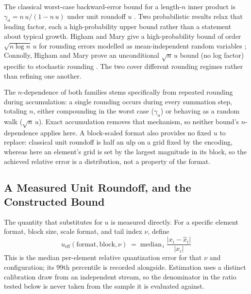 The classical worst-case backward-error bound for a length-$n$ inner product is
$\gamma_n = n\,u/(1-n\,u)$ under unit roundoff $u$ \citep{higham2002accuracy}.
Two probabilistic results relax that leading factor, each a high-probability
upper bound rather than a statement about typical growth. Higham and Mary give a
high-probability bound of order $\sqrt{n \log n}\,u$ for rounding errors modelled
as mean-independent random variables \citep{higham2019new}; Connolly, Higham and
Mary prove an unconditional $\sqrt{n}\,u$ bound (no log factor) specific to
stochastic rounding \citep{connolly2021stochastic}. The two cover different
rounding regimes rather than refining one another.

The $n$-dependence of both families stems specifically from repeated rounding
during accumulation: a single rounding occurs during every summation step,
totaling $n$, either compounding in the worst case ($\gamma_n$) or behaving as a
random walk ($\sqrt{n}\,u$). Exact accumulation removes that mechanism, so
neither bound's $n$-dependence applies here. A block-scaled format also provides
no fixed $u$ to replace: classical unit roundoff is half an ulp on a grid fixed
by the encoding, whereas here an element's grid is set by the largest magnitude
in its block, so the achieved relative error is a distribution, not a property of
the format.

\subsection{A Measured Unit Roundoff, and the Constructed Bound}
\label{sec:method:bound}

The quantity that substitutes for $u$ is measured directly. For a specific
element format, block size, scale format, and tail index $\nu$, define
\begin{equation}
  u_{\mathrm{eff}}(\mathrm{format}, \mathrm{block}, \nu)
  \;=\; \mathrm{median}_{\,i}\;
        \frac{\bigl|x_i - \hat{x}_i\bigr|}{\bigl|x_i\bigr|}
  \label{eq:ueff}
\end{equation}
 This is the median per-element relative quantization error for that
$\nu$ and configuration; its 99th percentile is recorded alongside. Estimation
uses a distinct calibration draw from an independent stream, so the denominator in
the ratio tested below is never taken from the sample it is evaluated against.

